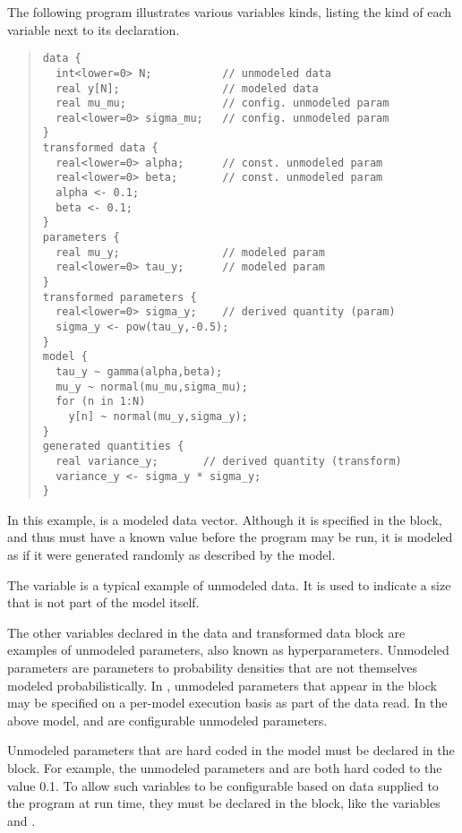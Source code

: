 The following program illustrates various variables kinds, listing the
kind of each variable next to its declaration.
%
\begin{quote}
\begin{Verbatim}[fontsize=\small]
data {
  int<lower=0> N;           // unmodeled data
  real y[N];                // modeled data
  real mu_mu;               // config. unmodeled param
  real<lower=0> sigma_mu;   // config. unmodeled param
}
transformed data {
  real<lower=0> alpha;      // const. unmodeled param
  real<lower=0> beta;       // const. unmodeled param
  alpha <- 0.1;       
  beta <- 0.1;
} 
parameters {
  real mu_y;                // modeled param
  real<lower=0> tau_y;      // modeled param
} 
transformed parameters {
  real<lower=0> sigma_y;    // derived quantity (param)
  sigma_y <- pow(tau_y,-0.5);
}
model {
  tau_y ~ gamma(alpha,beta);
  mu_y ~ normal(mu_mu,sigma_mu);
  for (n in 1:N)
    y[n] ~ normal(mu_y,sigma_y);
}
generated quantities {
  real variance_y;       // derived quantity (transform)
  variance_y <- sigma_y * sigma_y; 
}
\end{Verbatim}
\end{quote}
%
In this example,  is a modeled data vector.  Although it is
specified in the  block, and thus must have a known value
before the program may be run, it is modeled as if it were generated
randomly as described by the model.  

The variable  is a typical example of unmodeled data.  It is
used to indicate a size that is not part of the model itself.

The other variables declared in the data and transformed data block are
examples of unmodeled parameters, also known as hyperparameters.
Unmodeled parameters are parameters to probability densities that are
not themselves modeled probabilistically.  In \Stan, unmodeled
parameters that appear in the  block may be specified on a
per-model execution basis as part of the data read.  In the above
model,  and  are configurable unmodeled
parameters.  

Unmodeled parameters that are hard coded in the model must be declared
in the  block.  For example, the unmodeled
parameters  and  are both hard coded to the
value 0.1.  To allow such variables to be configurable based on data
supplied to the program at run time, they must be declared in the
 block, like the variables  and
.

